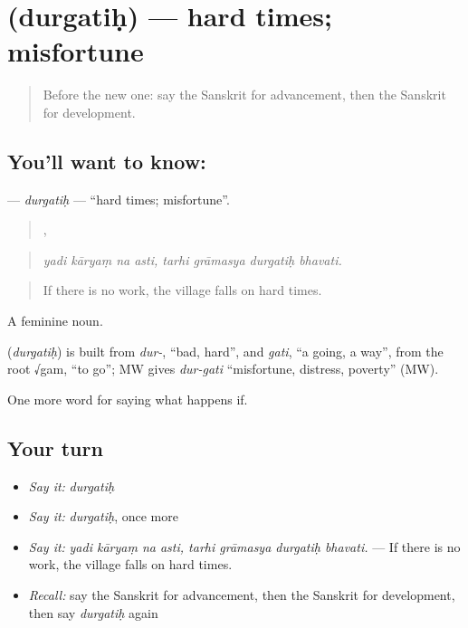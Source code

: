 \section[\texorpdfstring{\sk{दुर्गतिः} (durgatiḥ)}{दुर्गतिः (durgatiḥ)}]{ (durgatiḥ) — hard times; misfortune}

\label{lesson:SA-C387-durgatih}



\begin{quote}
Before the new one: say the Sanskrit for advancement, then the Sanskrit for development.
\end{quote}

\subsection*{You'll want to know: }
\textbf{} — \emph{durgatiḥ} — \textquotedblleft{}hard times; misfortune\textquotedblright{}.

\begin{quote}
   ,    
\end{quote}

\begin{quote}
\emph{yadi kāryaṃ na asti, tarhi grāmasya durgatiḥ bhavati.}
\end{quote}

\begin{quote}
If there is no work, the village falls on hard times.
\end{quote}

A feminine noun.

\begin{cousinweb}
\textbf{} (\emph{durgatiḥ}) is built from \emph{dur-}, \textquotedblleft{}bad, hard\textquotedblright{}, and \emph{gati}, \textquotedblleft{}a going, a way\textquotedblright{}, from the root √gam, \textquotedblleft{}to go\textquotedblright{}; MW gives \emph{dur-gati} \textquotedblleft{}misfortune, distress, poverty\textquotedblright{} (MW).
\end{cousinweb}

\begin{grammarlens}[title={What you've built}]
One more word for saying what happens if.
\end{grammarlens}

\subsection*{Your turn}
\begin{itemize}
\raggedright
  \item \emph{Say it:} \emph{durgatiḥ}
  \item \emph{Say it:} \emph{durgatiḥ}, once more
  \item \emph{Say it:} \emph{yadi kāryaṃ na asti, tarhi grāmasya durgatiḥ bhavati.} — If there is no work, the village falls on hard times.
  \item \emph{Recall:} say the Sanskrit for advancement, then the Sanskrit for development, then say \emph{durgatiḥ} again
\end{itemize}

